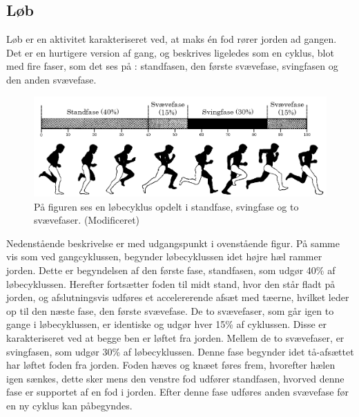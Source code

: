 \subsection{Løb}
Løb er en aktivitet karakteriseret ved, at maks én fod rører jorden ad gangen. 
Det er en hurtigere version af gang, og beskrives ligeledes som en cyklus, blot med fire faser, som det ses på : standfasen, den første svævefase, svingfasen og den anden svævefase. \citep{Adelaar1986,Novacheck1998}

\begin{figure}[H]
	\centering
	\includegraphics[scale=0.4]{figures/bProblemloesning/loeb_cyklus1.png}
	\caption{På figuren ses en løbecyklus opdelt i standfase, svingfase og to svævefaser. \citep{Adelaar1986} (Modificeret)}
	\label{fig:loebecyklus}
\end{figure}

Nedenstående beskrivelse er med udgangspunkt i ovenstående figur. \newline
På samme vis som ved gangcyklussen, begynder løbecyklussen idet højre hæl rammer jorden. Dette er begyndelsen af den første fase, standfasen, som udgør 40\% af løbecyklussen. Herefter fortsætter foden til midt stand, hvor den står fladt på jorden, og afslutningsvis udføres et accelererende afsæt med tæerne, hvilket leder op til den næste fase, den første svævefase. \citep{Adelaar1986,Novacheck1998} \newline
De to svævefaser, som går igen to gange i løbecyklussen, er identiske og udgør hver 15\% af cyklussen. Disse er karakteriseret ved at begge ben er løftet fra jorden. \citep{Adelaar1986,Novacheck1998} \newline
Mellem de to svævefaser, er svingfasen, som udgør 30\% af løbecyklussen. Denne fase begynder idet tå-afsættet har løftet foden fra jorden. Foden hæves og knæet føres frem, hvorefter hælen igen sænkes, dette sker mens den venstre fod udfører standfasen, hvorved denne fase er supportet af en fod i jorden. Efter denne fase udføres anden svævefase før en ny cyklus kan påbegyndes. \citep{Adelaar1986,Novacheck1998}

